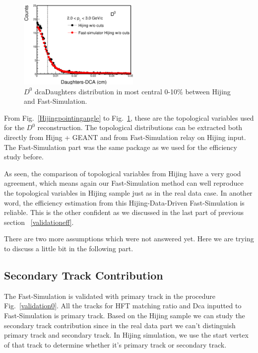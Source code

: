 \begin{figure}[htbp]
\centering
\includegraphics[keepaspectratio,width=0.52\textwidth]{figure/Run14_D0HFT/HijingdcaDaughters.eps}
\caption{$D^0$ dcaDaughters distribution in most central 0-10\% between Hijing and Fast-Simulation.}
\label{HijingdcaDaughters}
\end{figure}

From Fig.~\ref{Hijingpointingangle} to Fig.~\ref{HijingdcaDaughters}, these are the topological variables used for the $D^0$ reconstruction. The topological distributions can be extracted both directly from Hijng + GEANT and from Fast-Simulation relay on Hijing input. The Fast-Simulation part was the same package as we used for the efficiency study before.

As seen, the comparison of topological variables from Hijing have a very good agreement, which means again our Fast-Simulation method can well reproduce the topological variables in Hijing sample just as in the real data case. In another word, the efficiency estimation from this Hijing-Data-Driven Fast-Simulation is reliable.  This is the other confident as we discussed in the last part of previous section ~\ref{validationeff}.


There are two more assumptions which were not answered yet. Here we are trying to discuss a little bit in the following part.

\subsection{\label{concern1} Secondary Track Contribution}

The Fast-Simulation is validated with primary track in the procedure Fig.~\ref{validation0}. All the tracks for HFT matching ratio and Dca inputted to Fast-Simulation is primary track. Based on the Hijing sample we can study the secondary track contribution since in the real data part we can't distinguish primary track and secondary track. In Hijing simulation, we use the start vertex of that track to determine whether it's primary track or secondary track.

